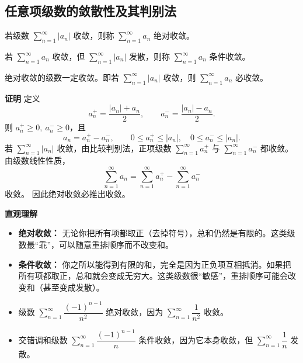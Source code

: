 \documentclass[fontset=fandol]{ctexart}
\newenvironment{custom}[1]{\par\noindent\textbf{#1}\quad}{\par\vspace{0.8em}}
\newenvironment{intuition}{\par\noindent\textbf{直观理解}\quad}{\par\vspace{0.8em}}
\begin{document}
\subsection{任意项级数的敛散性及其判别法}

\begin{definition}[绝对收敛]
	若级数 \(\sum\limits_{n = 1}^{  \infty } |a_n|\) 收敛，则称 \(\sum\limits_{n = 1}^{  \infty } a_n\) 绝对收敛。
\end{definition}

\begin{definition}[条件收敛]
	若 \(\sum\limits_{n = 1}^{  \infty } a_n\) 收敛，但 \(\sum\limits_{n = 1}^{  \infty } |a_n|\) 发散，则称 \(\sum\limits_{n = 1}^{  \infty } a_n\) 条件收敛。
\end{definition}

\begin{theorem}[绝对收敛与收敛的关系]
	绝对收敛的级数一定收敛。即若 \(\sum\limits_{n = 1}^{  \infty } |a_n|\) 收敛，则 \(\sum\limits_{n = 1}^{  \infty } a_n\) 必收敛。
\end{theorem}

\begin{custom}{证明}
	定义
	\[
	a_n^+=\frac{|a_n|+a_n}{2},\qquad a_n^-=\frac{|a_n|-a_n}{2}.
	\]
	则 $a_n^+\ge0,\ a_n^-\ge0$，且
	\[
	a_n=a_n^+-a_n^-,\qquad 0\le a_n^+\le |a_n|,\quad 0\le a_n^-\le |a_n|.
	\]
	若 $\sum\limits_{n = 1}^{  \infty } |a_n|$ 收敛，由比较判别法，正项级数 $\sum\limits_{n = 1}^{  \infty } a_n^+$ 与 $\sum\limits_{n = 1}^{  \infty } a_n^-$ 都收敛。 由级数线性性质，
	\[
	\sum_{n=1}^{\infty} a_n=\sum_{n=1}^{\infty} a_n^+-\sum_{n=1}^{\infty} a_n^-
	\]
	收敛。 因此绝对收敛必推出收敛。
\end{custom}

\begin{intuition}
	\begin{itemize}
		\item \textbf{绝对收敛：} 无论你把所有项都取正（去掉符号），总和仍然是有限的。这类级数最“乖”，可以随意重排顺序而不改变和。
		\item \textbf{条件收敛：} 你之所以能得到有限的和，完全是因为正负项互相抵消。如果把所有项都取正，总和就会变成无穷大。这类级数很“敏感”，重排顺序可能会改变和（甚至变成发散）。
	\end{itemize}
\end{intuition}

\begin{example}
	\begin{itemize}
		\item 级数 \(\sum\limits_{n = 1}^{  \infty } \dfrac{(-1)^{n-1}}{n^2}\) 绝对收敛，因为 \(\sum\limits_{n = 1}^{  \infty } \dfrac{1}{n^2}\) 收敛。
		\item 交错调和级数 \(\sum\limits_{n = 1}^{  \infty } \dfrac{(-1)^{n-1}}{n}\) 条件收敛，因为它本身收敛，但 \(\sum\limits_{n = 1}^{  \infty } \dfrac{1}{n}\) 发散。
	\end{itemize}
\end{example}
\end{document}
